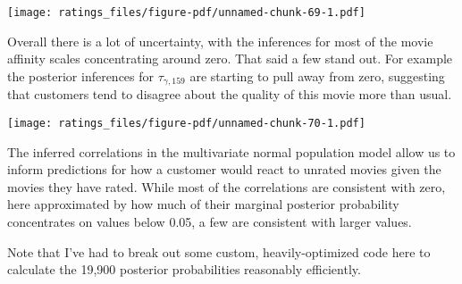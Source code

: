 \documentclass[
  letterpaper,
  DIV=11,
  numbers=noendperiod]{scrartcl}
\newenvironment{Shaded}{\begin{snugshade}}{\end{snugshade}}
\newcommand{\AttributeTok}[1]{\textcolor[rgb]{0.40,0.45,0.13}{#1}}
\newcommand{\DecValTok}[1]{\textcolor[rgb]{0.68,0.00,0.00}{#1}}
\newcommand{\FunctionTok}[1]{\textcolor[rgb]{0.28,0.35,0.67}{#1}}
\newcommand{\NormalTok}[1]{\textcolor[rgb]{0.00,0.23,0.31}{#1}}
\newcommand{\OtherTok}[1]{\textcolor[rgb]{0.00,0.23,0.31}{#1}}
\newcommand{\SpecialCharTok}[1]{\textcolor[rgb]{0.37,0.37,0.37}{#1}}
\newcommand{\StringTok}[1]{\textcolor[rgb]{0.13,0.47,0.30}{#1}}
\begin{document}
\texttt{[image: ratings\_files/figure-pdf/unnamed-chunk-69-1.pdf]}

Overall there is a lot of uncertainty, with the inferences for most of
the movie affinity scales concentrating around zero. That said a few
stand out. For example the posterior inferences for
\(\tau_{\gamma, 159}\) are starting to pull away from zero, suggesting
that customers tend to disagree about the quality of this movie more
than usual.

\begin{Shaded}
\end{Shaded}

\texttt{[image: ratings\_files/figure-pdf/unnamed-chunk-70-1.pdf]}

The inferred correlations in the multivariate normal population model
allow us to inform predictions for how a customer would react to unrated
movies given the movies they have rated. While most of the correlations
are consistent with zero, here approximated by how much of their
marginal posterior probability concentrates on values below 0.05, a few
are consistent with larger values.

Note that I've had to break out some custom, heavily-optimized code here
to calculate the 19,900 posterior probabilities reasonably efficiently.
\end{document}
